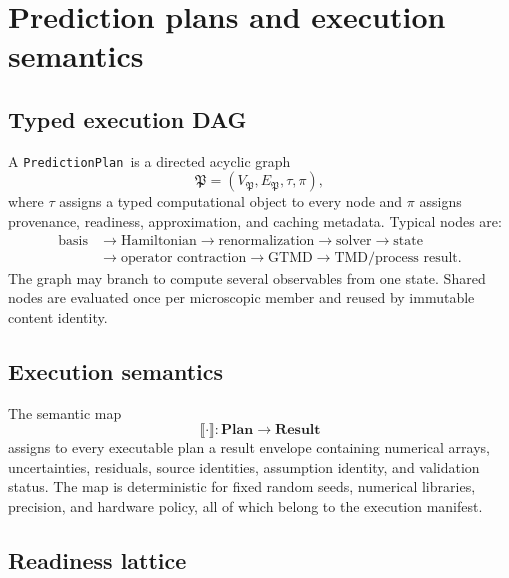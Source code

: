 \documentclass[11pt]{article}
\newcommand{\PlanCat}{\mathbf{Plan}}
\newcommand{\Pplan}{\mathfrak P}
\newcommand{\PredictionPlan}{\texttt{PredictionPlan}}
\begin{document}
\section{Prediction plans and execution semantics}
\label{sec:prediction-plan}

\subsection{Typed execution DAG}

A \PredictionPlan\ is a directed acyclic graph
\begin{equation}
 \Pplan=(V_{\Pplan},E_{\Pplan},\tau,\pi),
\label{eq:plan-dag}
\end{equation}
where \(\tau\) assigns a typed computational object to every node and \(\pi\)
assigns provenance, readiness, approximation, and caching metadata.  Typical
nodes are:
\begin{equation}
\begin{aligned}
 \text{basis}&\to\text{Hamiltonian}\to\text{renormalization}\to
 \text{solver}\to\text{state}\\
 &\to\text{operator contraction}\to\text{GTMD}\to
 \text{TMD/process result}.
\end{aligned}
\label{eq:plan-chain}
\end{equation}
The graph may branch to compute several observables from one state.  Shared
nodes are evaluated once per microscopic member and reused by immutable
content identity.

\subsection{Execution semantics}

The semantic map
\begin{equation}
 \llbracket\cdot\rrbracket:
 \PlanCat\longrightarrow\mathbf{Result}
\label{eq:execution-semantics}
\end{equation}
assigns to every executable plan a result envelope containing numerical arrays,
uncertainties, residuals, source identities, assumption identity, and
validation status.  The map is deterministic for fixed random seeds, numerical
libraries, precision, and hardware policy, all of which belong to the
execution manifest.

\subsection{Readiness lattice}
\end{document}
